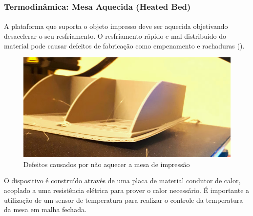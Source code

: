 \documentclass[12pt, english]{article}
\begin{document}
\subsubsection{Termodinâmica: Mesa Aquecida (Heated Bed)}

\paragraph{}
A plataforma que suporta o objeto impresso deve ser aquecida objetivando desacelerar o seu resfriamento. O resfriamento rápido e mal distribuído do material pode causar defeitos de fabricação como empenamento e rachaduras (\cite{Douglas2021}).

\begin{figure}[H]
	\centering
	\includegraphics[height=.4\linewidth]{warping.png}
	\caption{Defeitos causados por não aquecer a mesa de impressão}
\end{figure}

O dispositivo é construído através de uma placa de material condutor de calor, acoplado a uma resistência elétrica para prover o calor necessário. É importante a utilização de um sensor de temperatura para realizar o controle da temperatura da mesa em malha fechada.






\end{document}

